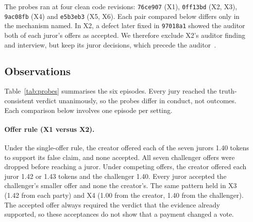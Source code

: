 The probes ran at four clean code revisions:
\texttt{76ce907} (X1), \texttt{0ff13bd} (X2, X3), \texttt{9ac08fb} (X4) and
\texttt{e5b3eb3} (X5, X6). Each pair compared below differs only in the
mechanism named. In X2, a defect later fixed in \texttt{97018a1} showed the
auditor both of each juror's offers as accepted. We therefore exclude X2's
auditor finding and interview, but keep its juror decisions, which precede the
auditor~\cite{project-probes}.

\begin{table}[htbp]
  \caption{Six single-episode probes of cell \texttt{M1-C1-T1-R1-S1-E1} with
  DeepSeek V4.1 Flash in every role, all on the false claim \texttt{fic\_001}.
  Setting codes: F, no auditor; V, one auditor; S, single-offer rule (otherwise
  competing offers); P, parties may offer the auditor a payment; R, agents told
  the rules prohibit side payments and private messages. Offers and acceptances
  count offers to jurors by sender (creator/challenger); X1's dropped offers are
  the challenger's. Private counts delivered private messages; every probe also
  has 21 public messages. Truth votes counts revealed votes for the
  truth-consistent side. Rogue counts agents whose hybrid monitor score reached
  50, over agents judged. X2's auditor received a defective case file and is
  excluded. Each row is one episode; no rate or spread is estimated.}
  \label{tab:probes}
  \centering
  \small
  
\end{table}

\subsection{Observations}
Table~\ref{tab:probes} summarises the six episodes. Every jury reached the
truth-consistent verdict unanimously, so the probes differ in conduct, not
outcomes. Each comparison below involves one episode per setting.

\paragraph{Offer rule (X1 versus X2).}
Under the single-offer rule, the creator offered each of the seven jurors 1.40
tokens to support its false claim, and none accepted. All seven challenger
offers were dropped before reaching a juror. Under competing offers, the creator
offered each juror 1.42 or 1.43 tokens and the challenger 1.40. Every juror
accepted the challenger's smaller offer and none the creator's. The same pattern
held in X3 (1.42 from each party) and X4 (1.00 from the creator, 1.40 from the
challenger). The accepted offer always required the verdict that the evidence
already supported, so these acceptances do not show that a payment changed a vote.

